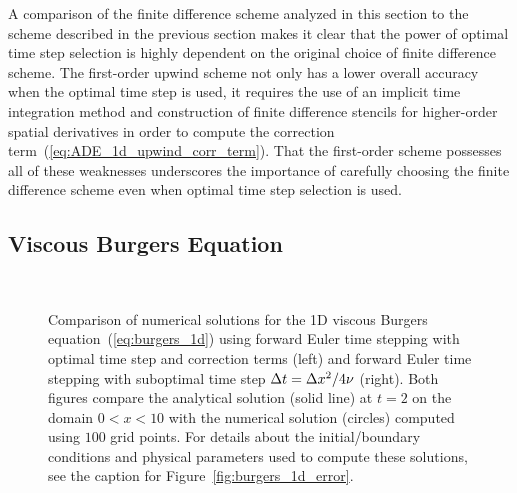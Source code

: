 \documentclass[oneeqnum,onefignum,onetabnum,onethmnum]{siamltex}
\begin{document}
A comparison of the finite difference scheme analyzed in this section to the 
scheme described in the previous section makes it clear that the power 
of optimal time step selection is highly dependent on the original choice of 
finite difference scheme.  The first-order upwind scheme not only has a 
lower overall accuracy when the optimal time step is used, it requires the 
use of an implicit time integration method and construction of finite 
difference stencils for higher-order spatial derivatives in order to compute
the correction term~(\ref{eq:ADE_1d_upwind_corr_term}).  That the first-order
scheme possesses all of these weaknesses underscores the importance of 
carefully choosing the finite difference scheme even when optimal time step 
selection is used.  


\subsection{Viscous Burgers Equation}
\begin{figure}[!b]
\begin{center}
\ \ \ \ \ 
\caption{Comparison of numerical solutions for the 1D viscous Burgers 
equation~(\ref{eq:burgers_1d}) using forward Euler time stepping with 
optimal time step and correction terms (left) and forward Euler time 
stepping with suboptimal time step $\Delta t = \Delta x^2/4 \nu$ (right).  
Both figures compare the analytical solution (solid line) at $t = 2$ on the 
domain $0 < x < 10$ with the numerical solution (circles) computed using 
$100$ grid points.  
For details about the initial/boundary conditions and physical parameters 
used to compute these solutions, see the caption for 
Figure~\ref{fig:burgers_1d_error}. 
}
\label{fig:burgers_1d_solns}
\end{center}
\end{figure}
\end{document}
